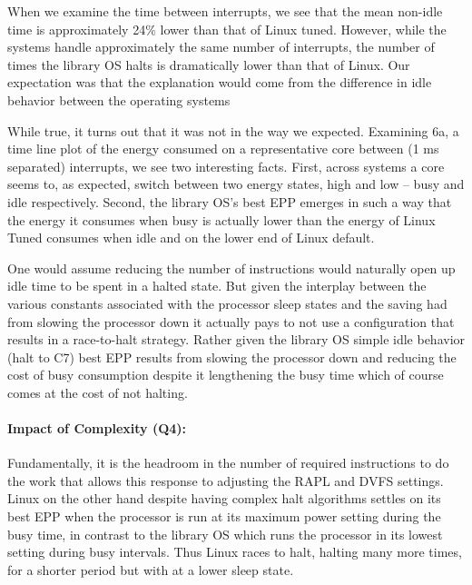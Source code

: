 When we examine  the time between interrupts, we see that the mean non-idle time is approximately 24\% lower than that of Linux tuned.  
However, while the systems handle approximately the same number of interrupts, the number of times the library OS halts is dramatically lower than that of Linux.    
Our expectation was that the explanation would come from the difference in idle behavior between the operating systems

While true, it turns out that it was not in the way we expected.  
Examining 6a, a time line plot of the energy consumed on a representative core between (1 ms separated) interrupts, we see two interesting facts.  
First, across systems a core seems to, as expected, switch between two energy states, high  and low -- busy and idle respectively.  
Second, the library OS's best EPP emerges in such a way that the energy it consumes when busy is actually lower than the energy of Linux Tuned consumes when idle and on the lower end of Linux default.  

One would assume reducing the number of instructions  would naturally open up idle time to be spent in a halted state.  
But given the interplay between the various constants associated with the processor sleep states and the saving had from slowing the processor down it actually pays to not use a configuration that results in a race-to-halt strategy.  
Rather given the library OS simple idle behavior (halt to C7) best EPP results from slowing the processor down and reducing the cost of busy consumption despite it lengthening the busy time which of course comes at the cost of not halting.  

\vspace{-.2in}
\paragraph{Impact of Complexity (Q4):} Fundamentally, it is the headroom in the number of required instructions to do the work that allows this response to adjusting the RAPL and DVFS settings.
Linux on the other hand despite having complex halt algorithms settles on its best EPP when the processor is run at its maximum power setting during the busy time, in contrast to the library OS which runs the processor in its lowest setting during busy intervals.
Thus Linux races to halt, halting many more times, for a shorter period but with at a lower sleep state. 

